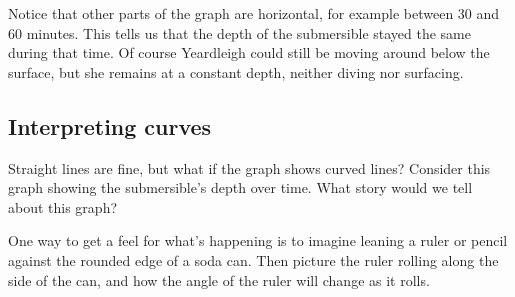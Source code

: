 Notice that other parts of the graph are horizontal, for example between 30 and 60 minutes. This tells us that the depth of the submersible stayed the same during that time. Of course Yeardleigh could still be moving around below the surface, but she remains at a constant depth, neither diving nor surfacing.

\subsection{Interpreting curves}

Straight lines are fine, but what if the graph shows curved lines? Consider this graph showing the submersible's depth over time. What story would we tell about this graph?


\begin{center} %
\end{center} %

One way to get a feel for what's happening is to imagine leaning a ruler or pencil against the rounded edge of a soda can. Then picture the ruler rolling along the side of the can, and how the angle of the ruler will change as it rolls.

